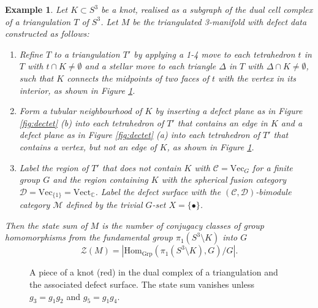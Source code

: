 \documentclass[1.5pt, a4paper]{article}
\newcommand{\C}{\mathbb{C}}
\newcommand{\mac}{\mathcal C}
\newcommand{\mad}{\mathcal D}
\newcommand{\mam}{\mathcal M}
\newcommand{\Hom}{\mathrm{Hom}}
\newtheorem{example}[theorem]{Example}
\begin{document}
 
 \begin{example}\label{ex:knotcomplement} Let $K\subset S^3$ be a knot, realised as a subgraph of the dual cell complex of 
 a triangulation $T$ of 
  $S^3$. Let $M$ be the triangulated 3-manifold with defect data constructed as follows: 
  \begin{enumerate}
\item   Refine $T$ to a triangulation $T'$ by 
applying a 1-4  move to each tetrahedron $t$  in $T$ with $t\cap K\neq \emptyset$ and a stellar move to each triangle $\Delta$ in $T$ with $\Delta \cap K\neq \emptyset$, such that $K$ connects the midpoints of two faces of $t$ with the vertex in its interior, as shown in Figure \ref{fig:knotcomplement}.  

\item Form a tubular neighbourhood of $K$ by  inserting a defect plane as in Figure \ref{fig:dectet} (b) into each tetrahedron of $T'$ that contains an  edge in $K$ and a defect plane as in  Figure \ref{fig:dectet} (a) into each tetrahedron of $T'$ that contains a vertex, but not an edge of $K$, as shown in Figure \ref{fig:knotcomplement}. 
 
 \item Label the region of $T'$ that does not contain $K$ with  $\mac=\mathrm{Vec}_G$ for a finite group $G$ and the region containing  $K$ with the spherical fusion category $\mad=\mathrm{Vec}_{\{1\}}=\mathrm{Vect}_\C$. Label  the defect surface with the  $(\mac,\mad)$-bimodule category $\mam$ defined by the trivial $G$-set $X=\{\bullet\}$. 
 \end{enumerate}
 Then the state sum of  $M$ is the number of  conjugacy classes of group homomorphisms from the fundamental group $\pi_1(S^3\setminus K)$  into $G$ 
 $$
 \mathcal Z(M)=|\Hom_{\mathrm{Grp}}(\pi_1(S^3\setminus K), G)/G|.
 $$
 \end{example}
 
 
 \begin{figure}
\begin{center}
\def\svgwidth{.5\columnwidth}
 
 \end{center}
\caption{A piece of a knot (red)  in the dual complex of a triangulation and the associated defect surface. The state sum vanishes unless $g_3=g_1g_2$ and $g_5=g_1g_4$.}
 \label{fig:knotcomplement}
\end{figure}
\end{document}
